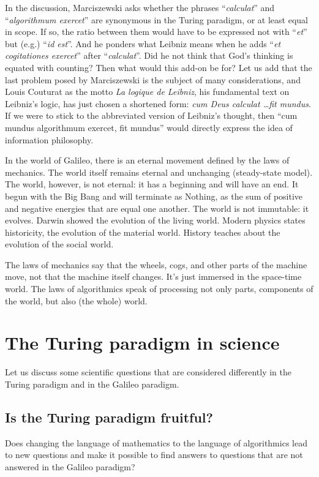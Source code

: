 \documentclass[pdftex,12pt]{article}
\begin{document}
In the discussion, Marciszewski asks whether the phrases ``\emph{calculat}'' and ``\emph{algorithmum exercet}'' are synonymous in the Turing paradigm, or at least equal in scope. If so, the ratio between them would have to be expressed not with ``\emph{et}'' but (e.g.) ``\emph{id est}''. And he ponders what Leibniz means when he adds ``\emph{et cogitationes exercet}'' after ``\emph{calculat}''. Did he not think that God's thinking is equated with counting? Then what would this add-on be for? Let us add that the last problem posed by Marciszewski is the subject of many considerations, and Louis Couturat \parencite*{Couturat1901} as the motto \emph{La logique de {L}eibniz}, his fundamental text on Leibniz's logic, has just chosen a shortened form: \emph{cum Deus calculat \dots fit mundus}. If we were to stick to the abbreviated version of Leibniz's thought, then ``cum mundus algorithmum exercet, fit mundus'' would directly express the idea of information philosophy.

In the world of Galileo, there is an eternal movement defined by the laws of mechanics. The world itself remains eternal and unchanging (steady-state model). The world, however, is not eternal: it has a beginning and will have an end. It begun with the Big Bang and will terminate as Nothing, as the sum of positive and negative energies that are equal one another. The world is not immutable: it evolves. Darwin showed the evolution of the living world. Modern physics states historicity, the evolution of the material world. History teaches about the evolution of the social world.

The laws of mechanics say that the wheels, cogs, and other parts of the machine move, not that the machine itself changes. It's just immersed in the space-time world. The laws of algorithmics speak of processing not only parts, components of the world, but also (the whole) world.


\section{The Turing paradigm in science} Let us discuss some scientific questions that are considered differently in the Turing paradigm and in the Galileo paradigm.



\subsection{Is the Turing paradigm fruitful?} Does changing the language of mathematics to the language of algorithmics lead to new questions and make it possible to find answers to questions that are not answered in the Galileo paradigm?
\end{document}
